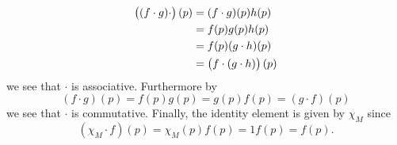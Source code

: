 \begin{solution}
	\begin{align*}
		\del[1]{(f \cdot g) \cdot}(p) &= (f \cdot g)(p)h(p)\\
		&= f(p)g(p)h(p)\\
		&= f(p)(g \cdot h)(p)\\
		&= \del[1]{f \cdot (g \cdot h)}(p)
	\end{align*}
	\noindent we see that $\cdot$ is associative. Furthermore by
	\begin{equation*}
		(f \cdot g)(p) = f(p) g(p) = g(p) f(p) = (g \cdot f)(p)
	\end{equation*}
	\noindent we see that $\cdot$ is commutative. Finally, the identity element is given by $\chi_M$ since 
	\begin{equation*}
		(\chi_M \cdot f)(p) = \chi_M(p)f(p) = 1f(p) = f(p).
	\end{equation*}
\end{solution}
